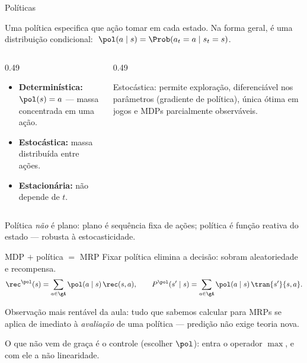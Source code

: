 \documentclass[aspectratio=169, 11pt]{beamer}
\begin{document}
\begin{frame}{Políticas}
  \begin{defbox}{}
    Uma política especifica que ação tomar em cada estado. Na forma geral, é uma
    distribuição condicional: $\;\pol(a \mid s) = \Prob(a_t = a \mid s_t = s)$.
  \end{defbox}
  \begin{columns}[T]
    \begin{column}{0.49\textwidth}
      {\small
      \begin{itemize}\setlength{\itemsep}{0.4ex}
        \item \textbf{Determinística:} $\pol(s) = a$ --- massa concentrada em uma ação.
        \item \textbf{Estocástica:} massa distribuída entre ações.
        \item \textbf{Estacionária:} não depende de $t$.
      \end{itemize}}
    \end{column}
    \begin{column}{0.49\textwidth}
      \begin{ideiabox}
        Estocástica: permite exploração, diferenciável nos parâmetros (gradiente de
        política), única ótima em jogos e MDPs parcialmente observáveis.
      \end{ideiabox}
    \end{column}
  \end{columns}
  \begin{alertabox}
    Política \emph{não} é plano: plano é sequência fixa de ações; política é
    \alert{função reativa} do estado --- robusta à estocasticidade.
  \end{alertabox}
\end{frame}

\begin{frame}{MDP $+$ política $=$ MRP}
  Fixar política elimina a decisão: sobram aleatoriedade e recompensa.
  \[
    \rec^{\pol}(s) = \sum_{a \in \gA} \pol(a \mid s)\, \rec(s,a),
    \qquad
    P^{\pol}(s' \mid s) = \sum_{a \in \gA} \pol(a \mid s)\, \tran{s'}{s,a}.
  \]
  \begin{ideiabox}
    Observação mais rentável da aula: \alert{tudo} que sabemos calcular para MRPs se
    aplica de imediato à \emph{avaliação} de uma política --- predição não exige teoria
    nova.
  \end{ideiabox}
  \begin{alertabox}
    O que não vem de graça é o \alert{controle} (escolher $\pol$): entra o operador
    $\max$, e com ele a não linearidade.
  \end{alertabox}
\end{frame}
\end{document}

